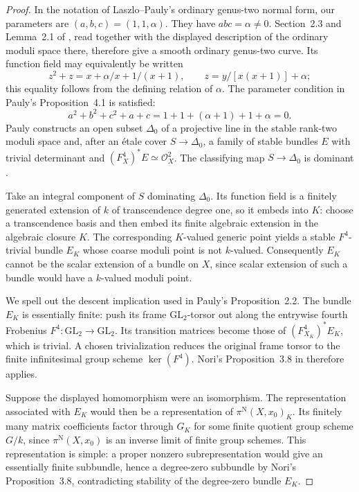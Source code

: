 \begin{proof}
In the notation of Laszlo--Pauly's ordinary genus-two normal form,
our parameters are $(a,b,c)=(1,1,\alpha)$.
They have $abc=\alpha\ne0$.  Section~2.3 and Lemma~2.1 of
\cite{A567_LaszloPauly2004}, read together with the displayed
description of the ordinary moduli space there, therefore give a
smooth ordinary genus-two curve.  Its function field may equivalently
be written
\[
 z^2+z=x+\alpha/x+1/(x+1),
 \qquad z=y/[x(x+1)]+\alpha;
\]
this equality follows from the defining relation of $\alpha$.
The parameter condition in Pauly's Proposition~4.1 is satisfied:
\[
 a^2+b^2+c^2+a+c
 =1+1+(\alpha+1)+1+\alpha=0.
\]
Pauly constructs an open subset $\Delta_0$ of a projective line in
the stable rank-two moduli space and, after an \'etale cover
$S\to\Delta_0$, a family of stable bundles $E$ with trivial
determinant and $(F_X^4)^*E\simeq\mathcal O_X^2$.
The classifying map $S\to\Delta_0$ is dominant
\cite[Proposition~4.1 and its complete proof, pp.~2--4]{A567_Pauly2007}.

Take an integral component of $S$ dominating $\Delta_0$.
Its function field is a finitely generated extension of $k$ of
transcendence degree one, so it embeds into $K$: choose a
transcendence basis and then embed its finite algebraic extension
in the algebraic closure $K$.  The corresponding $K$-valued
generic point yields a stable $F^4$-trivial bundle $E_K$ whose
coarse moduli point is not $k$-valued.  Consequently $E_K$ cannot
be the scalar extension of a bundle on $X$, since scalar extension
of such a bundle would have a $k$-valued moduli point.

We spell out the descent implication used in Pauly's Proposition~2.2.
The bundle $E_K$ is essentially finite: push its frame
$\mathrm{GL}_2$-torsor out along the entrywise fourth Frobenius
$F^4:\mathrm{GL}_2\to\mathrm{GL}_2$.  Its transition matrices
become those of $(F_{X_K}^4)^*E_K$, which is trivial.  A chosen
trivialization reduces the original frame torsor to the finite
infinitesimal group scheme $\ker(F^4)$.  Nori's
Proposition~3.8 in \cite{A567_Nori1976} therefore applies.

Suppose the displayed homomorphism were an isomorphism.  The
representation associated with $E_K$ would then be a representation
of $\pi^{\mathrm N}(X,x_0)_K$.  Its finitely many matrix coefficients
factor through $G_K$ for some finite quotient group scheme $G/k$,
since $\pi^{\mathrm N}(X,x_0)$ is an inverse limit of finite group
schemes.  This representation is simple: a proper nonzero
subrepresentation would give an essentially finite subbundle,
hence a degree-zero subbundle by Nori's Proposition~3.8,
contradicting stability of the degree-zero bundle $E_K$.


\end{proof}
